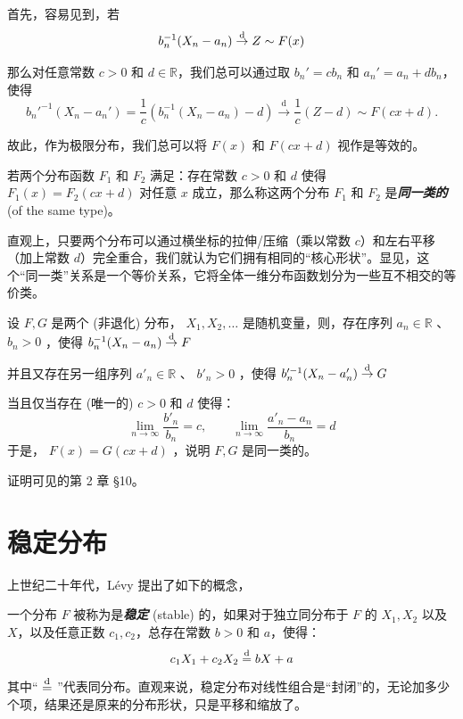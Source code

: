 首先，容易见到，若\[ b_n^{-1}(X_{n}-a_n)\overset{\rm d}\to Z\sim F(x) \]

那么对任意常数 $c>0$ 和 $d\in\mathbb R$，我们总可以通过取 $b_n'=cb_n$ 和 $a_n'=a_n+db_n$，使得
\[
b_n'^{-1}(X_{n}-a_n')=\frac1c(b_n^{-1}(X_n-a_n)-d) \overset{\text{d}}\to \frac1c(Z-d)\sim F(cx+d).
\]

故此，作为极限分布，我们总可以将 $F(x)$ 和 $F(cx+d)$ 视作是等效的。

\begin{definition*}[同型分布]
若两个分布函数 $F_1$ 和 $F_2$ 满足：存在常数 $c>0$ 和 $d$ 使得 $F_1(x)=F_2(cx+d)$ 对任意 $x$ 成立，那么称这两个分布 $F_1$ 和 $F_2$ 是\textbf{\emph{同一类的}} (of the same type)。
\end{definition*}

直观上，只要两个分布可以通过横坐标的拉伸/压缩（乘以常数 $c$）和左右平移（加上常数 $d$）完全重合，我们就认为它们拥有相同的``核心形状''。显见，这个``同一类''关系是一个等价关系，它将全体一维分布函数划分为一些互不相交的等价类。

\begin{theorem}[收敛型定理]
\label{thm:ext-stable:convergence-types}

设 $F,G$ 是两个 (非退化) 分布， $X_1,X_2,\dots$ 是随机变量，则，存在序列 $a_n\in\mathbb R$ 、 $b_n>0$ ，使得 $b_n^{-1}(X_n-a_n)\overset{\rm d}\to F$

并且又存在另一组序列 $a'_n\in\mathbb R$ 、 $b'_n>0$ ，使得 $b'^{-1}_n(X_n-a'_n)\overset{\rm d}\to G$

当且仅当存在 (唯一的) $c>0$ 和 $d$ 使得： \[ \lim_{n\to\infty}\frac{b'_n}{b_n}=c,\qquad \lim_{n\to\infty}\frac{a'_n-a_n}{b_n}=d \]于是， $F(x)=G(cx+d)$ ，说明 $F,G$ 是同一类的。

\end{theorem}
证明可见\cite{gnedenko1954}的第 2 章 §10。


\section{稳定分布}

上世纪二十年代，Lévy 提出了如下的概念，

\begin{definition*}[稳定分布]
一个分布 $F$ 被称为是\textbf{\emph{稳定}} (stable) 的，如果对于独立同分布于 $F$ 的 $X_1,X_2$ 以及 $X$，以及任意正数 $c_1,c_2$，总存在常数 $b>0$ 和 $a$，使得：
\[c_1 X_1 + c_2 X_2 \overset{\rm d}{=} b X + a\]
其中`` $\overset {\rm d}=$ ''代表同分布。直观来说，稳定分布对线性组合是``封闭''的，无论加多少个项，结果还是原来的分布形状，只是平移和缩放了。
\end{definition*}

